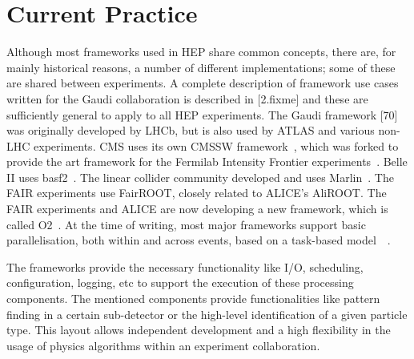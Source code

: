\documentclass[12pt,a4paper]{article}
\begin{document}
\section{Current Practice}
\label{sec:current-practice}

Although most frameworks used in HEP share common concepts, there are,
for mainly historical reasons, a number of different implementations;
some of these are shared between experiments. A complete description
of framework use cases written for the Gaudi collaboration is
described in {[}2.fixme{]} and these are sufficiently general to apply
to all HEP experiments. The Gaudi framework {[}70{]} was originally
developed by LHCb, but is also used by ATLAS and various non-LHC
experiments. CMS uses its own CMSSW framework~\cite{Bayatian:2006nff},
which was forked to provide the art framework for the Fermilab
Intensity Frontier experiments~\cite{Green:2012gv}.  Belle II uses
basf2~\cite{1742-6596-331-3-032024}. The linear collider community
developed and uses Marlin~\cite{Gaede:2006pj}. The FAIR experiments
use FairROOT, closely related to ALICE's AliROOT. The FAIR experiments
and ALICE are now developing a new framework, which is called
O2~\cite{O2}. At the time of writing, most major frameworks support
basic parallelisation, both within and across events, based on a
task-based model~\cite{Jones:2015soc}~\cite{Clemencic:2015paa}.

The frameworks provide the necessary functionality like I/O,
scheduling, configuration, logging, etc to support the execution of
these processing components. The mentioned components provide
functionalities like pattern finding in a certain sub-detector or the
high-level identification of a given particle type. This layout allows
independent development and a high flexibility in the usage of physics
algorithms within an experiment collaboration.
\end{document}
